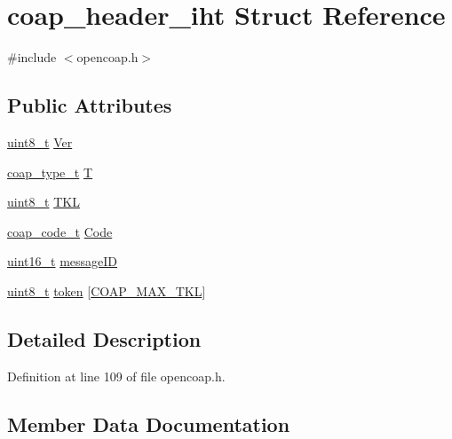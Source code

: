 \hypertarget{structcoap__header__iht}{}\section{coap\+\_\+header\+\_\+iht Struct Reference}
\label{structcoap__header__iht}


{\ttfamily \#include $<$opencoap.\+h$>$}

\subsection*{Public Attributes}
\begin{DoxyCompactItemize}
\item 
\hyperlink{_p_e___types_8h_aba7bc1797add20fe3efdf37ced1182c5}{uint8\+\_\+t} \hyperlink{structcoap__header__iht_a7c91ec54c6613ffc3dafd1a0a2ebff98}{Ver}
\item 
\hyperlink{group__open_coap_gafb608e0d646391b17d00513242200087}{coap\+\_\+type\+\_\+t} \hyperlink{structcoap__header__iht_a7975560a7e79711dac9271a09fbb0447}{T}
\item 
\hyperlink{_p_e___types_8h_aba7bc1797add20fe3efdf37ced1182c5}{uint8\+\_\+t} \hyperlink{structcoap__header__iht_a3ea4f92aab536bae6966352c186353fd}{T\+KL}
\item 
\hyperlink{group__open_coap_gae99fde61d59e68af70c6bcd0c7b0256f}{coap\+\_\+code\+\_\+t} \hyperlink{structcoap__header__iht_a318a869594fc123bf89ed5c7042d6128}{Code}
\item 
\hyperlink{_p_e___types_8h_a1f1825b69244eb3ad2c7165ddc99c956}{uint16\+\_\+t} \hyperlink{structcoap__header__iht_a1f5ad66110c895370f2ee2aac10f0945}{message\+ID}
\item 
\hyperlink{_p_e___types_8h_aba7bc1797add20fe3efdf37ced1182c5}{uint8\+\_\+t} \hyperlink{structcoap__header__iht_a68bba3927a3956bd222e063dc156c8ef}{token} \mbox{[}\hyperlink{group__open_coap_gac74ba1d96b0defa127ca13247884a8d4}{C\+O\+A\+P\+\_\+\+M\+A\+X\+\_\+\+T\+KL}\mbox{]}
\end{DoxyCompactItemize}


\subsection{Detailed Description}


Definition at line 109 of file opencoap.\+h.



\subsection{Member Data Documentation}
